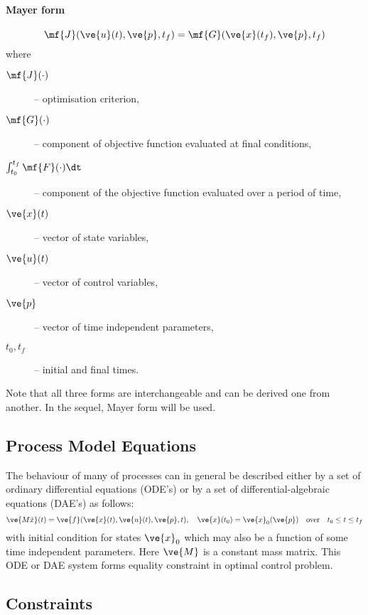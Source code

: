 \paragraph{Mayer form}
\begin{equation}
\mf{J}(\ve{u}(t),\ve{p},t_{f}) = \mf{G}(\ve{x}(t_{f}),\ve{p},t_{f})
\label{eq:mayer} 
\end{equation}where
\begin{description}
\item[$\mf{J}(\cdot)$] -- optimisation criterion,
\item[$\mf{G}(\cdot)$] -- component of objective function evaluated at
  final conditions, 
\item[$\int_{t_{0}}^{t_{f}}\mf{F}(\cdot)\dt$] -- component of the
  objective 
  function evaluated over a period of time, 
\item[$\ve{x}(t)$] --  vector of state variables,
\item[$\ve{u}(t)$] -- vector of control variables,
\item[$\ve{p}$] -- vector of time independent parameters,
\item[$t_0,t_{f}$] -- initial and final times.
\end{description}
Note that all three forms are interchangeable and can be derived one
from another. In the sequel, Mayer form will be used.
 
\subsection{Process Model Equations}
\label{sec:pme}

The behaviour of many of processes can in general be described either
by a set of ordinary differential equations (ODE's) or by a set of
differential-algebraic equations (DAE's) as follows:
\begin{equation}
\ve{M\dot{x}}(t) = \ve{f}(\ve{x}(t),\ve{u}(t),\ve{p},t), \quad
\ve{x}(t_{0}) = \ve{x}_0(\ve{p}) \quad \textnormal{over} \quad t_{0} \leq t
\leq t_{f} \label{eq:process} 
\end{equation} with initial condition for states $\ve{x}_{0}$ which may
also be a function of some time independent parameters. Here $\ve{M}$
is a constant mass matrix. This ODE or DAE system forms equality constraint
in optimal control problem. 

\subsection{Constraints}
\label{sec:cons}

